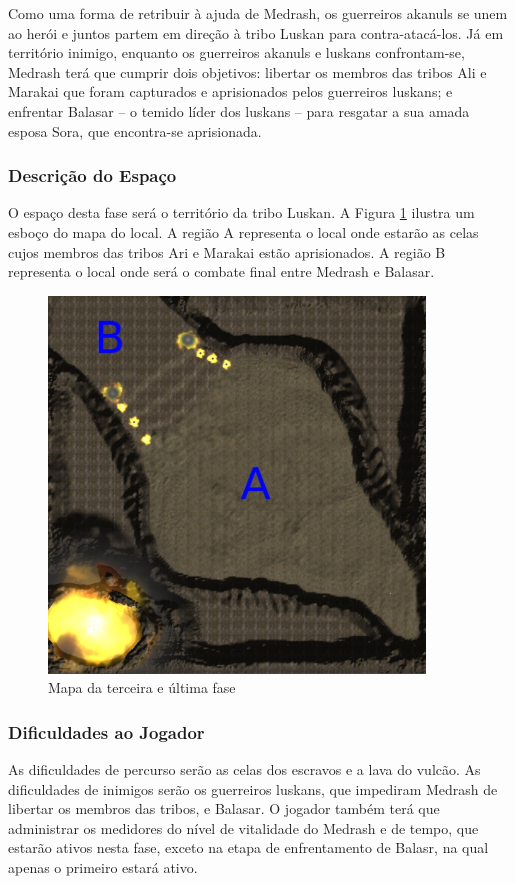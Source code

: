 Como uma forma de retribuir à ajuda de Medrash, os guerreiros akanuls se unem ao herói e juntos partem em direção à tribo Luskan para contra-atacá-los. Já em território inimigo, enquanto os guerreiros akanuls e luskans confrontam-se, Medrash terá que cumprir dois objetivos: libertar os membros das tribos Ali e Marakai que foram capturados e aprisionados pelos guerreiros luskans; e enfrentar Balasar -- o temido líder dos luskans -- para resgatar a sua amada esposa Sora, que encontra-se aprisionada.

\subsubsection{Descrição do Espaço}

O espaço desta fase será o território da tribo Luskan. A Figura \ref{fig:MapaDaFase3} ilustra um esboço do mapa do local. A região A representa o local onde estarão as celas cujos membros das tribos Ari e Marakai estão aprisionados. A região B representa o local onde será o combate final entre Medrash e Balasar.

\begin{figure}
\centering
\includegraphics[width=10cm]{fases_mapa_3.jpg} 
\caption{Mapa da terceira e última fase}
\label{fig:MapaDaFase3}
\end{figure}

\subsubsection{Dificuldades ao Jogador}

As dificuldades de percurso serão as celas dos escravos e a lava do vulcão. As dificuldades de inimigos serão os guerreiros luskans, que impediram Medrash de libertar os membros das tribos, e Balasar. O jogador também terá que administrar os medidores do nível de vitalidade do Medrash e de tempo, que estarão ativos nesta fase, exceto na etapa de enfrentamento de Balasr, na qual apenas o primeiro estará ativo.

